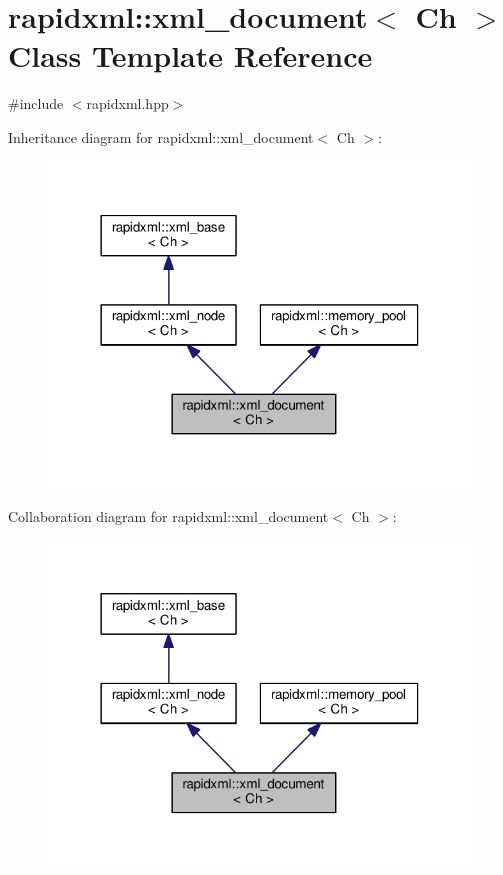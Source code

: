 \hypertarget{classrapidxml_1_1xml__document}{}\section{rapidxml\+:\+:xml\+\_\+document$<$ Ch $>$ Class Template Reference}
\label{classrapidxml_1_1xml__document}


{\ttfamily \#include $<$rapidxml.\+hpp$>$}



Inheritance diagram for rapidxml\+:\+:xml\+\_\+document$<$ Ch $>$\+:\nopagebreak
\begin{figure}[H]
\begin{center}
\leavevmode
\includegraphics[width=318pt]{classrapidxml_1_1xml__document__inherit__graph}
\end{center}
\end{figure}


Collaboration diagram for rapidxml\+:\+:xml\+\_\+document$<$ Ch $>$\+:\nopagebreak
\begin{figure}[H]
\begin{center}
\leavevmode
\includegraphics[width=318pt]{classrapidxml_1_1xml__document__coll__graph}
\end{center}
\end{figure}
